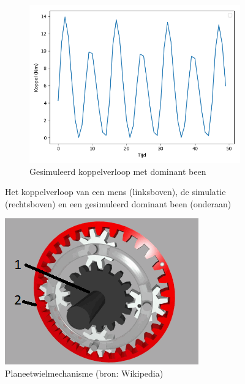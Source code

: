 \begin{figure}[t!]
\begin{subfigure}{.5\textwidth}
  \includegraphics[width=\linewidth]{images/gesimuleerdekoppeldominantbeen.png}
  \caption{Gesimuleerd koppelverloop met dominant been}
  \label{fig:gesimuleerde koppel dominant been}
\end{subfigure}
\caption{Het koppelverloop van een mens (linksboven), de simulatie (rechtsboven) en een gesimuleerd dominant been (onderaan)}
\label{fig:koppelverloop mens-simulatie}
\end{figure}
\newpage
\begin{figure}
  \centering
  \includegraphics[width=\linewidth]{images/planeetwielmechanisme.png}
  \caption{Planeetwielmechanisme (bron: Wikipedia)}
  \label{fig:planeetwielmechanisme}
\end{figure}

